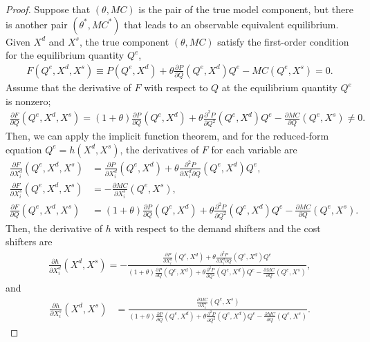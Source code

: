 \documentclass[11pt, a4paper]{article}
\theoremstyle{remark}
\begin{document}
\begin{proof}
    Suppose that $(\theta, MC)$ is the pair of the true model component, but there is another pair $(\theta^{*}, MC^{*})$ that leads to an observable equivalent equilibrium.
    Given $X^{d}$ and $X^{s}$, the true component $(\theta, MC)$ satisfy the first-order condition for the equilibrium quantity $Q^e$,
    \begin{align}
    F(Q^e, X^{d}, X^{s}) \equiv P(Q^e, X^{d}) + \theta\frac{\partial P}{\partial Q}(Q^e, X^{d})Q^e - MC(Q^e, X^{s}) = 0.
\end{align}
Assume that the derivative of $F$ with respect to $Q$ at the equilibrium quantity $Q^e$ is nonzero;
\begin{align}
    \frac{\partial F}{\partial Q}(Q^e, X^{d}, X^{s}) = (1+\theta)\frac{\partial P}{\partial Q}(Q^e, X^{d}) + \theta\frac{\partial^2 P}{\partial Q^2}(Q^e, X^{d})Q^e - \frac{\partial MC}{\partial Q}(Q^e, X^{s}) \ne 0.
\end{align}
Then, we can apply the implicit function theorem, and for the reduced-form equation $Q^e = h(X^{d}, X^{s})$, the derivatives of $F$ for each variable are
\begin{align}
    \frac{\partial F}{\partial X^{d}_i}(Q^e, X^{d}, X^{s}) & =  \frac{\partial P}{\partial X^{d}_{i}}(Q^e, X^{d}) + \theta\frac{\partial^2 P}{\partial X^{d}_{i}\partial Q}(Q^e, X^{d})Q^e,\\
    \frac{\partial F}{\partial X^{s}_i}(Q^e, X^{d}, X^{s}) & =  -\frac{\partial MC}{\partial X^{s}_{i}}(Q^e, X^{s}),\\
    \frac{\partial F}{\partial Q}(Q^e, X^{d}, X^{s}) & = (1+\theta)\frac{\partial P}{\partial Q}(Q^e, X^{d}) + \theta\frac{\partial^2 P}{\partial Q^2}(Q^e, X^{d})Q^e - \frac{\partial MC}{\partial Q}(Q^e, X^{s}).
\end{align}
Then, the derivative of $h$ with respect to the demand shifters and the cost shifters are
\begin{align}
    \frac{\partial h}{\partial X^{d}_{i}}(X^{d}, X^{s}) = -\frac{\frac{\partial P}{\partial X^{d}_{i}}(Q^e, X^{d}) + \theta\frac{\partial^2 P}{\partial X^{d}_{i}\partial Q}(Q^e, X^{d})Q^e }{(1+\theta)\frac{\partial P}{\partial Q}(Q^e, X^{d}) + \theta\frac{\partial^2 P}{\partial Q^2}(Q^e, X^{d})Q^e - \frac{\partial MC}{\partial Q}(Q^e, X^{s})}, \label{eq:foc_derivative_demand}
\end{align}
and
\begin{align}
    \frac{\partial h}{\partial X^{s}_{i}}(X^{d}, X^{s}) & = \frac{\frac{\partial MC}{\partial X^{s}_{i}}(Q^e, X^{s})}{(1+\theta)\frac{\partial P}{\partial Q}(Q^e, X^{d}) + \theta\frac{\partial^2 P}{\partial Q^2}(Q^e, X^{d})Q^e - \frac{\partial MC}{\partial Q}(Q^e, X^{s})}. \label{eq:foc_derivative_supply}

\end{align}
\end{proof}
\end{document}
